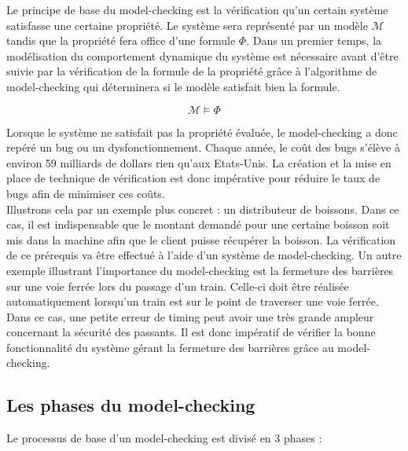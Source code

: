 \documentclass[runningheads,a4paper,10pt]{llncs}
\begin{document}
\noindent
Le principe de base du model-checking est la vérification qu'un certain système satisfasse une certaine propriété. Le système sera représenté par un modèle $\mathcal{M}$ tandis que la propriété fera office d'une formule $\Phi$. Dans un premier temps, la modélisation du comportement dynamique du système est nécessaire avant d'être suivie par la vérification de la formule de la propriété grâce à l'algorithme de model-checking qui déterminera si le modèle satisfait bien la formule.  

$$\boxed{\mathcal{M} \vDash \Phi}$$

\noindent
Lorsque le système ne satisfait pas la propriété évaluée, le model-checking a donc repéré un bug ou un dysfonctionnement. Chaque année, le coût des bugs s'élève à environ 59 milliards de dollars \cite{ErrorCost} rien qu'aux Etats-Unis. La création et la mise en place de technique de vérification est donc impérative pour réduire le taux de bugs afin de minimiser ces coûts.  \\

\noindent
Illustrons cela par un exemple plus concret : un distributeur de boissons. Dans ce cas, il est indispensable que le montant demandé pour une certaine boisson soit mis dans la machine afin que le client puisse récupérer la boisson. La vérification de ce prérequis va être effectué à l'aide d'un système de model-checking. 
Un autre exemple illustrant l'importance du model-checking est la fermeture des barrières sur une voie ferrée lors du passage d'un train. 
Celle-ci doit être réalisée automatiquement lorsqu'un train est sur le point de traverser une voie ferrée. Dans ce cas, une petite erreur de timing peut avoir une très grande ampleur concernant la sécurité des passants. Il est donc impératif de vérifier la bonne fonctionnalité du système gérant la fermeture des barrières grâce au model-checking. 

\noindent 

\subsection{Les phases du model-checking}

Le processus de base d'un model-checking est divisé en 3 phases : 
\end{document}
